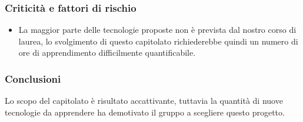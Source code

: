 \subsubsection{Criticità e fattori di rischio}
\begin{itemize}
	\item La maggior parte delle tecnologie proposte non è prevista dal nostro corso di laurea, lo svolgimento di questo capitolato richiederebbe quindi un numero di ore di apprendimento difficilmente quantificabile.
\end{itemize}
\subsubsection{Conclusioni}
Lo scopo del capitolato è risultato accattivante, tuttavia la quantità di nuove tecnologie da apprendere ha demotivato il gruppo a scegliere questo progetto.